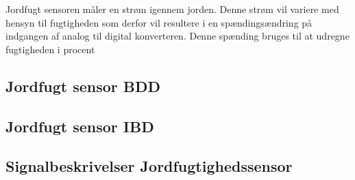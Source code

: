 
Jordfugt sensoren måler en strøm igennem jorden. Denne strøm vil variere med hensyn til fugtigheden som derfor vil resultere i en spændingsændring på indgangen af analog til digital konverteren. Denne spænding bruges til at udregne fugtigheden i procent

\subsection{Jordfugt sensor BDD}

\subsection{Jordfugt sensor IBD}

\subsection{Signalbeskrivelser Jordfugtighedssensor}
